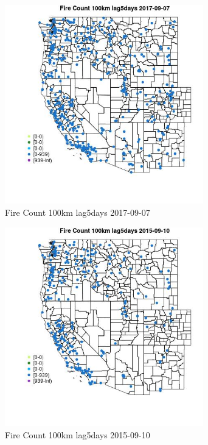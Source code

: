 \begin{figure} 
\centering  
\includegraphics[width=0.77\textwidth]{Code_Outputs/Report_ML_input_PM25_Step4_part_e_de_duplicated_aves_compiled_2019-05-20wNAs_MapObsFire_Count_100km_lag5days2017-09-07.jpg} 
\caption{\label{fig:Report_ML_input_PM25_Step4_part_e_de_duplicated_aves_compiled_2019-05-20wNAsMapObsFire_Count_100km_lag5days2017-09-07}Fire Count 100km lag5days 2017-09-07} 
\end{figure} 
 

\clearpage 

\begin{figure} 
\centering  
\includegraphics[width=0.77\textwidth]{Code_Outputs/Report_ML_input_PM25_Step4_part_e_de_duplicated_aves_compiled_2019-05-20wNAs_MapObsFire_Count_100km_lag5days2015-09-10.jpg} 
\caption{\label{fig:Report_ML_input_PM25_Step4_part_e_de_duplicated_aves_compiled_2019-05-20wNAsMapObsFire_Count_100km_lag5days2015-09-10}Fire Count 100km lag5days 2015-09-10} 
\end{figure} 
 

